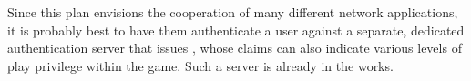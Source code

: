 Since this plan envisions the cooperation of many different network
applications, it is probably best to have them authenticate a user against
a separate, dedicated authentication
server that issues
,
whose claims can also indicate various levels of play privilege
within the game.
Such a server is already in the works.